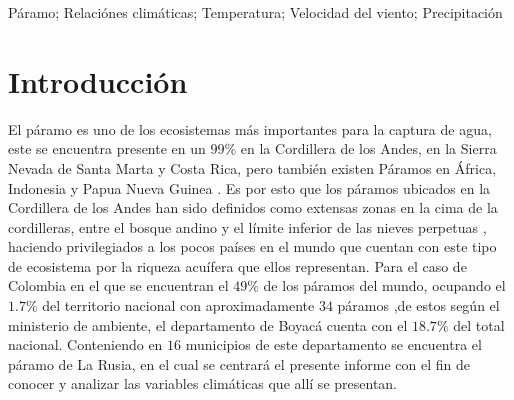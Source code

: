 \documentclass[conference,final,]{IEEEtran}
\begin{document}
\begin{IEEEkeywords}
Páramo; Relaciónes climáticas; Temperatura; Velocidad del viento; Precipitación
\end{IEEEkeywords}




\maketitle


%
\IEEEpeerreviewmaketitle


\hypertarget{introducciuxf3n}{%
\section{Introducción}\label{introducciuxf3n}}

El páramo es uno de los ecosistemas más importantes para la captura de
agua, este se encuentra presente en un \(99 \%\) en la Cordillera de los
Andes, en la Sierra Nevada de Santa Marta y Costa Rica, pero también
existen Páramos en África, Indonesia y Papua Nueva Guinea
\cite{cabrera}. Es por esto que los páramos ubicados en la Cordillera de
los Andes han sido definidos como extensas zonas en la cima de la
cordilleras, entre el bosque andino y el límite inferior de las nieves
perpetuas \cite{cabrera}, haciendo privilegiados a los pocos países en
el mundo que cuentan con este tipo de ecosistema por la riqueza acuífera
que ellos representan. Para el caso de Colombia en el que se encuentran
el \(49 \%\) de los páramos del mundo, ocupando el \(1.7 \%\) del
territorio nacional con aproximadamente \(34\) páramos \cite{cabrera},de
estos según el ministerio de ambiente, el departamento de Boyacá cuenta
con el \(18.7 \%\) del total nacional. Conteniendo en \(16\) municipios
de este departamento se encuentra el páramo de La Rusia, en el cual se
centrará el presente informe con el fin de conocer y analizar las
variables climáticas que allí se presentan.
\end{document}
